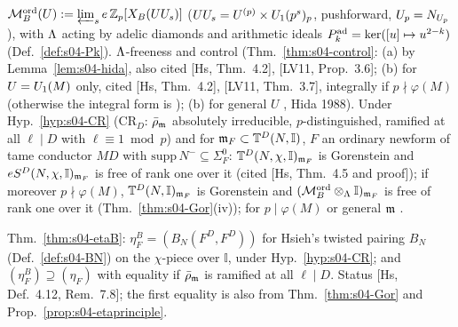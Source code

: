 \begin{interface}\label{if:s04-Mord}
$\mathcal{M}^{\mathrm{ord}}_B(U):=\varprojlim_se\,\mathbb{Z}_p[X_B(UU_s)]$ ($UU_s=U^{(p)}\times U_1(p^s)_p$, pushforward, $U_p=N_{U_p}$), with $\Lambda$ acting by adelic
diamonds and arithmetic ideals $P^{\rm ad}_k=\ker([u]\mapsto u^{2-k})$ (Def.~\ref{def:s04-Pk}). $\Lambda$-freeness and control
(Thm.~\ref{thm:s04-control}: (a) \stproved{} by Lemma~\ref{lem:s04-hida}, also cited [Hs, Thm.~4.2], [LV11, Prop.~3.6]; (b) for
$U=U_1(M)$ only, cited [Hs, Thm.~4.2], [LV11, Thm.~3.7], integrally if $p\nmid\varphi(M)$ (otherwise the integral form is \stsketch);
(b) for general $U$ \stexp, Hida 1988).
Under Hyp.~\ref{hyp:s04-CR} (CR$_D$: $\bar\rho_{\mathfrak{m}}$ absolutely irreducible, $p$-distinguished, ramified at all $\ell\mid D$ with
$\ell\equiv1\bmod p$) and for $\mathfrak{m}_F\subset\mathbb{T}^D(N,\mathbb I)$, $F$ an ordinary newform of tame conductor $MD$ with $\mathrm{supp}\,N^-\subseteq\Sigma^0_F$:
$\mathbb{T}^D(N,\chi,\mathbb I)_{\mathfrak{m}_F}$ is Gorenstein and $eS^D(N,\chi,\mathbb I)_{\mathfrak{m}_F}$ is free of rank one over it (cited [Hs, Thm.~4.5 and
proof]); if moreover $p\nmid\varphi(M)$, $\mathbb{T}^D(N,\mathbb I)_{\mathfrak{m}_F}$ is Gorenstein and $(\mathcal{M}^{\mathrm{ord}}_B\otimes_\Lambda\mathbb I)_{\mathfrak{m}_F}$ is free of rank
one over it (Thm.~\ref{thm:s04-Gor}(iv)); for $p\mid\varphi(M)$ or general $\mathfrak{m}$ \stexp.
\end{interface}
\begin{interface}\label{if:s04-etaB}
Thm.~\ref{thm:s04-etaB}: $\eta^B_F=(B_N(F^D,F^D))$ for Hsieh's twisted pairing $B_N$ (Def.~\ref{def:s04-BN}) on the $\chi$-piece over
$\mathbb I$, under Hyp.~\ref{hyp:s04-CR}; and $(\eta^B_F)\supseteq(\eta_F)$ with equality if $\bar\rho_{\mathfrak{m}}$ is ramified at all $\ell\mid D$.
Status \stcited{} [Hs, Def.~4.12, Rem.~7.8]; the first equality is also \stpmc{} from Thm.~\ref{thm:s04-Gor} and
Prop.~\ref{prop:s04-etaprinciple}.
\end{interface}
